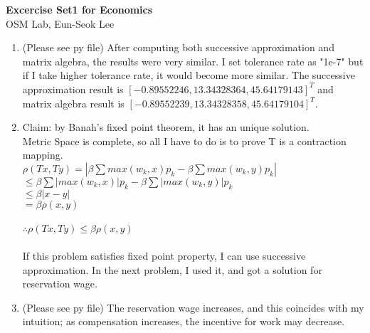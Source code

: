 \documentclass[letterpaper,12pt]{article}
\theoremstyle{definition}
\begin{document}
\begin{flushleft}
   \textbf{\large{Excercise Set1 for Economics}} \\[5pt]
   OSM Lab, Eun-Seok Lee \\[5pt]
 
\end{flushleft}

\vspace{5mm}

\begin{enumerate}

       
	\item  (Please see py file) After computing both successive approximation and matrix algebra, the results were very similar. I set tolerance rate as "1e-7" but if I take
		 higher tolerance rate, it would become more similar. The successive approximation result is $[-0.89552246, 13.34328364, 45.64179143]^{T}$
		and matrix algebra result is $[-0.89552239, 13.34328358, 45.64179104]^{T}$.

	\item Claim: by Banah's fixed point theorem, it has an unique solution.\\
		 Metric Space is complete, so all I have to do is to prove T is a contraction mapping.\\
		$\rho(Tx,Ty) = |\beta \sum max(w_{k}, x)p_{k} - \beta \sum max(w_{k}, y)p_{k}| $ \\
				  $\leq \beta \sum |max(w_{k}, x)|p_{k} - \beta \sum |max(w_{k}, y)|p_{k}$ \\
				  $\leq \beta |x-y|$ \\
				  $= \beta\rho(x,y)$ \\ \\
                                  $\therefore \rho(Tx,Ty) \leq \beta\rho(x,y)$ \\ \\
		If this problem satisfies fixed point property, I can use successive approximation. In the next problem, I used it, and got a solution for reservation wage.

   		
   	\item (Please see py file) The reservation wage increases, and this coincides with my intuition; as compensation increases, the incentive for work may decrease.

\end{enumerate}

\vspace{25mm}
\end{document}
